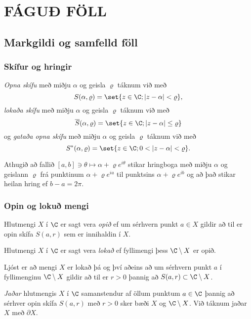 %
\chapter
{FÁGUÐ FÖLL}
 



\section{Markgildi og samfelld föll}

\subsection*{Skífur og hringir}


{\it Opna skífu} með miðju $\alpha$ og geisla
$\varrho$ táknum við með
$$ S(\alpha,\varrho)=\set{z\in \C; |z-\alpha|<\varrho}, $$
{\it lokaða skífu} með miðju $\alpha$ og geisla 
$\varrho$ táknum við með
$$ \overline S(\alpha,\varrho)=\set{z\in \C; |z-\alpha|\leq\varrho} $$
og {\it gataða opna skífu} með miðju $\alpha$ og
geisla $\varrho$ táknum við með
$$ S^*(\alpha,\varrho)=\set{z\in \C; 0<|z-\alpha|<\varrho}. $$


Athugið að fallið $[a,b]\ni \theta\mapsto \alpha+\varrho e^{i\theta}$ stikar
hringboga með miðju $\alpha$ og geislann $\varrho$ frá punktinum
$\alpha+\varrho e^{ia}$
til punktsins $\alpha+\varrho e^{ib}$ og að það stikar heilan hring ef 
$b-a=2\pi$.

\subsection*{Opin og lokuð mengi}

Hlutmengi $X$ í $\C$ er sagt vera {\it opið} ef um sérhvern punkt $a\in X$
gildir að til er opin skífa $S(a,r)$ sem er innihaldin í $X$.

Hlutmengi  $X$ í $\C$ er sagt vera {\it lokað } ef fyllimengi þess
$\C\setminus X$ er opið.  

Ljóst er að mengi $X$ er lokað þá og því
aðeins að um sérhvern punkt $a$ í fyllimenginu $\C\setminus X$ gildir
að til er $r>0$ þannig að $S(a,r)\subset \C\setminus X$.  


{\it Jaðar} hlutmengis $X$ í $\C$ samanstendur af öllum punktum
$a\in \C$ þannig að sérhver opin skífa $S(a,r)$ með $r>0$ sker bæði
$X$ og $\C\setminus X$.  Við táknum jaðar $X$ með $\partial X$.  

